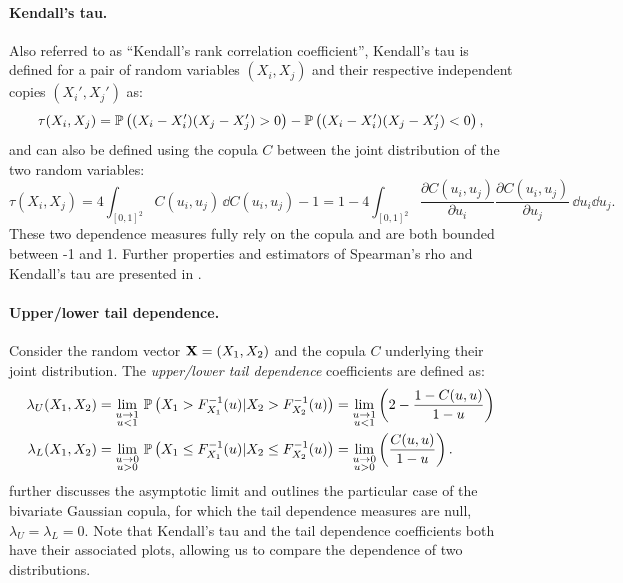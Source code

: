 \paragraph{Kendall's tau.} 
Also referred to as ``Kendall's rank correlation coefficient'', Kendall's tau is defined for a pair of random variables $(X_i, X_j)$ and their respective independent copies $(X_i', X_j')$ as: 
\begin{equation}
    \tau(X_i, X_j) = \P\left((X_i - X_i')(X_j - X_j') > 0 \right) - \P\left((X_i - X_i')(X_j - X_j') < 0 \right),
\end{equation}
and can also be defined using the copula $C$ between the joint distribution of the two random variables: 
\begin{equation}
    \tau(X_i, X_j) = 4 \int_{[0, 1]^2} C(u_i, u_j) \, \dd C(u_i, u_j) - 1 = 1 - 4 \int_{[0, 1]^2} \frac{\partial C(u_i, u_j)}{\partial u_i} \frac{\partial C(u_i, u_j)}{\partial u_j} \, \dd u_i \dd u_j. 
\end{equation}
These two dependence measures fully rely on the copula and are both bounded between -1 and 1. 
Further properties and estimators of Spearman's rho and Kendall's tau are presented in \citet[Section 2.4]{durante_2015_copula}. 

\paragraph{Upper/lower tail dependence.} 
Consider the random vector $\bX = (X_1, X_2)$ and the copula $C$ underlying their joint distribution. 
The \textit{upper/lower tail dependence} coefficients are defined as: 
\begin{subequations}
    \begin{align}
        \lambda_U(X_1, X_2) &= \lim_{\substack{u \rightarrow 1 \\ u<1}} \, \P\left(X_1 > F_{X_1}^{-1}(u) | X_2 > F_{X_2}^{-1}(u)\right) =       \lim_{\substack{u \rightarrow 1 \\ u<1}} \left(2 - \frac{1 - C(u, u)}{1 - u}\right)\\
        \lambda_L(X_1, X_2) &= \lim_{\substack{u \rightarrow 0 \\ u>0}} \, \P\left(X_1 \leq F_{X_1}^{-1}(u) | X_2 \leq F_{X_2}^{-1}(u)\right) = \lim_{\substack{u \rightarrow 0 \\ u>0}} \left(\frac{C(u, u)}{1 - u}\right). 
    \end{align}
\end{subequations}
\cite{joe_2014} further discusses the asymptotic limit and outlines the particular case of the bivariate Gaussian copula, for which the tail dependence measures are null, $\lambda_U = \lambda_L = 0$.
Note that Kendall's tau and the tail dependence coefficients both have their associated plots, allowing us to compare the dependence of two distributions.

